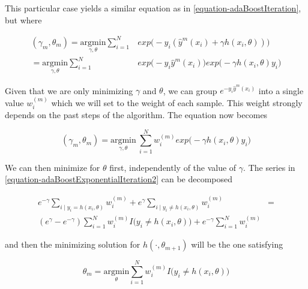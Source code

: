 \documentclass{article}%
\theoremstyle{definition}
\begin{document}
This particular case yields a similar equation as in \ref{equation-adaBoostIteration}, but where

\begin{equation} \label{equation-adaBoostExponentialIteration}
\begin{split}
(\gamma_{m}, \theta_{m}) = \underset{\gamma, \theta}{\mathrm{argmin}}  \sum_{i=1}^{N} & exp\big( -y_i  (\hat{y}^{m}(x_i) + \gamma h(x_i,\theta) )\big) \\
= \underset{\gamma, \theta}{\mathrm{argmin}}  \sum_{i=1}^{N} & exp\big( -y_i  \hat{y}^{m}(x_i)\big) exp\big(- \gamma h(x_i,\theta)y_i \big) 
\end{split}
\end{equation}


Given that we are only minimizing $\gamma$ and $\theta$, we can group $e^{-y_i  \hat{y}^{m}(x_i)}$ into a single value $w_i^{(m)}$ which we will set to the weight of each sample. This weight strongly depends on the past steps of the algorithm.  The equation now becomes


\begin{equation} \label{equation-adaBoostExponentialIteration2}
(\gamma_{m}, \theta_{m}) = \underset{\gamma, \theta}{\mathrm{argmin}} \    \sum_{i=1}^{N}  w_i^{(m)} exp \big(-\gamma h(x_i,\theta)y_i \big) 
\end{equation}

We can then minimize for $\theta$ first, independently of the value of $\gamma$. The series in \ref{equation-adaBoostExponentialIteration2} can be decomposed 

\begin{equation} \label{equation-adaBoostThetaDecomposition}
\begin{split}
e^{-\gamma} \sum_{i \mid y_i = h(x_i,\theta)} w_i^{(m)}  + e^{\gamma} \sum_{i \mid y_i \neq h(x_i,\theta)} w_i^{(m)} & = \\
( e^{\gamma} - e^{-\gamma}) \sum_{i = 1}^{N} w_i^{(m)} I \big( y_i \neq h(x_i,\theta)   \big)  + e^{-\gamma} \sum_{i = 1}^{N}   w_i^{(m)} &
\end{split}
\end{equation}


and then the minimizing solution for $h(\cdot, \theta_{m+1})$ will be the one satisfying

\begin{equation} \label{equation-adaBoostThetaMinimization}
\theta_{m} = \underset{ \theta}{\mathrm{argmin}}  \sum_{i=1}^{N}  w_i^{(m)} I \big( y_i \neq h(x_i,\theta)   \big) 
\end{equation}
\end{document}
